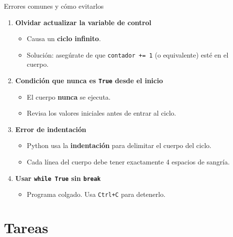 \documentclass[aspectratio=169,xcolor=dvipsnames]{beamer}
\begin{document}
\begin{frame}{Errores comunes y c\'omo evitarlos}
    \footnotesize
    \begin{enumerate}
        \item \textbf{Olvidar actualizar la variable de control}
        \begin{itemize}
            \item Causa un \textbf{ciclo infinito}.
            \item Soluci\'on: aseg\'urate de que \texttt{contador += 1} (o equivalente) est\'e en el cuerpo.
        \end{itemize}

        \vspace{0.2cm}
        \item \textbf{Condici\'on que nunca es \texttt{True} desde el inicio}
        \begin{itemize}
            \item El cuerpo \textbf{nunca} se ejecuta.
            \item Revisa los valores iniciales antes de entrar al ciclo.
        \end{itemize}

        \vspace{0.2cm}
        \item \textbf{Error de indentaci\'on}
        \begin{itemize}
            \item Python usa la \textbf{indentaci\'on} para delimitar el cuerpo del ciclo.
            \item Cada l\'inea del cuerpo debe tener exactamente 4 espacios de sangr\'ia.
        \end{itemize}

        \vspace{0.2cm}
        \item \textbf{Usar \texttt{while True} sin \texttt{break}}
        \begin{itemize}
            \item Programa colgado. Usa \texttt{Ctrl+C} para detenerlo.
        \end{itemize}
    \end{enumerate}
\end{frame}

\section{Tareas}
\end{document}
